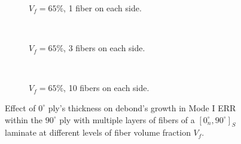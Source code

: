 \documentclass[review]{elsarticle}
\begin{document}
\begin{figure}[!h]
    \begin{subfigure}[b]{0.3\textwidth}
        \caption{$V_{f}=65\%$, 1 fiber on each side.}\label{subfig:sideabovefiber65MIcase1}
    \end{subfigure} ~
   \begin{subfigure}[b]{0.3\textwidth}
        \caption{$V_{f}=65\%$, 3 fibers on each side.}\label{subfig:sideabovefiber65MIcase2}
    \end{subfigure} ~
\begin{subfigure}[b]{0.3\textwidth}
        \caption{$V_{f}=65\%$, 10 fibers on each side.}\label{subfig:sideabovefiber65MIcase3}
    \end{subfigure}

\caption{Effect of $0^{\circ}$ ply's thickness on debond's growth in Mode I ERR within the $90^{\circ}$ ply with multiple layers of fibers of a $\left[0^{\circ}_{n}, 90^{\circ}\right]_{S}$ laminate at different levels of fiber volume fraction $V_{f}$.}\label{fig:sideabovefibersthicknessMI}
\end{figure}
\end{document}
